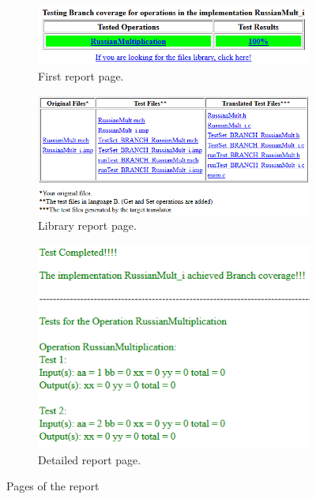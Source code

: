 \documentclass[runningheads]{llncs}
\begin{document}
\begin{figure}[ht]
\begin{minipage}{0.45\textwidth}
\begin{subfigure}{\textwidth}
\centering
\includegraphics[natwidth=547,natheight=118,width = \textwidth]{imagens/reporte1.png}
\caption{First report page.}
\label{fig:report1}
\end{subfigure}
\begin{subfigure}{\textwidth}
\centering
\includegraphics[natwidth=660,natheight=290,width = \textwidth]{imagens/reporte3.png}
\caption{Library report page.}
\label{fig:report3}
\end{subfigure}
\end{minipage}
\begin{subfigure}{0.50\textwidth}
\centering
\includegraphics[natwidth=425,natheight=319,width = \textwidth]{imagens/reporte2.png}
\caption{Detailed report page.}
\label{fig:report2}
\end{subfigure}
\caption{Pages of the report}
\end{figure}
\end{document}
